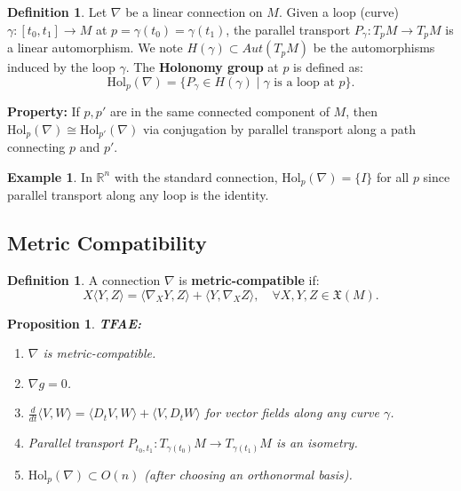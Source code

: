 \documentclass[11pt, a4paper]{article}
\theoremstyle{plain}
\newtheorem{proposition}[theorem]{Proposition}
\theoremstyle{definition}
\newtheorem{definition}[theorem]{Definition}
\newtheorem{example}[theorem]{Example}
\theoremstyle{remark}
\begin{document}
\begin{definition}
Let $\nabla$ be a linear connection on $M$. Given a loop (curve) $\gamma: [t_0, t_1] \to M$ at $p = \gamma(t_0) = \gamma(t_1)$, the parallel transport $P_{\gamma}: T_p M \to T_p M$ is a linear automorphism. 
We note $H(\gamma) \subset Aut(T_p M)$ be the automorphisms induced by the loop $\gamma$.
The \textbf{Holonomy group} at $p$ is defined as:
\[ \text{Hol}_p(\nabla) = \{ P_{\gamma} \in H(\gamma) \mid \gamma \text{ is a loop at } p \}. \]
\end{definition}

\textbf{Property:} If $p, p'$ are in the same connected component of $M$, then $\text{Hol}_p(\nabla) \cong \text{Hol}_{p'}(\nabla)$ via conjugation by parallel transport along a path connecting $p$ and $p'$.
\begin{example}
    In $\mathbb{R}^n$ with the standard connection, $\text{Hol}_p(\nabla) = \{I\}$ for all $p$ since parallel transport along any loop is the identity.
\end{example}

\subsection{Metric Compatibility}

\begin{definition}
A connection $\nabla$ is \textbf{metric-compatible} if:
\[ X\langle Y, Z \rangle = \langle \nabla_X Y, Z \rangle + \langle Y, \nabla_X Z \rangle, \quad \forall X, Y, Z \in \mathfrak{X}(M). \]
\end{definition}

\begin{proposition}
    \textbf{TFAE:}
    \begin{enumerate}
    \item $\nabla$ is metric-compatible.
    \item $\nabla g = 0$.
    \item $\frac{d}{dt} \langle V, W \rangle = \langle D_t V, W \rangle + \langle V, D_t W \rangle$ for vector fields along any curve $\gamma$.
    \item Parallel transport $P_{t_0, t_1}: T_{\gamma(t_0)}M \to T_{\gamma(t_1)}M$ is an isometry.
    \item $\text{Hol}_p(\nabla) \subset O(n)$ (after choosing an orthonormal basis).
\end{enumerate}
\end{proposition}
\end{document}
